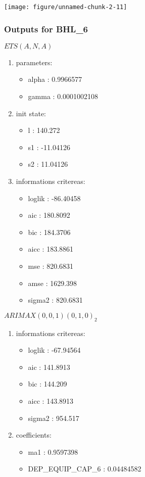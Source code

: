 \documentclass[10pt,a4paper]{article}\usepackage[]{graphicx}\usepackage[]{color}
\makeatletter
\def\maxwidth{ %
  \ifdim\Gin@nat@width>\linewidth
    \linewidth
  \else
    \Gin@nat@width
  \fi
}
\newcommand{\AaA}{\_}
\makeatother
\begin{document}
\texttt{[image: figure/unnamed-chunk-2-11]} 

\newpage
\subsubsection{Outputs for BHL\AaA 6}
\begin{multicols}{2}


$ ETS(A,N,A) $
\begin{enumerate}
\item parameters:
\begin{itemize}
\item  alpha :  0.9966577 
\item  gamma :  0.0001002108 
\end{itemize}
\item init state:
\begin{itemize}
\item  l :  140.272 
\item  s1 :  -11.04126 
\item  s2 :  11.04126 
\end{itemize}
\item informations critereas:
\begin{itemize}
\item  loglik :  -86.40458 
\item  aic :  180.8092 
\item  bic :  184.3706 
\item  aicc :  183.8861 
\item  mse :  820.6831 
\item  amse :  1629.398 
\item  sigma2 :  820.6831 
\end{itemize}
\end{enumerate}

\columnbreak


 $ARIMAX(0,0,1)(0,1,0)_{2}$ 
\begin{enumerate}
\item informations critereas:
\begin{itemize}
\item  loglik :  -67.94564 
\item  aic :  141.8913 
\item  bic :  144.209 
\item  aicc :  143.8913 
\item  sigma2 :  954.517 
\end{itemize}

\item coefficients:
\begin{itemize}
\item  ma1 :  0.9597398 
\item  DEP\AaA EQUIP\AaA CAP\AaA 6 :  0.04484582 
\end{itemize}
\end{enumerate}
\end{multicols}
\end{document}
